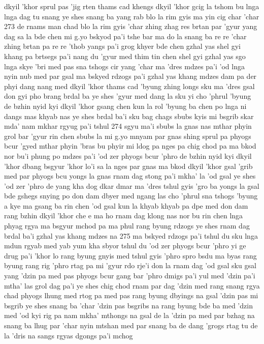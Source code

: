 dkyil 'khor sprul pas 'jig rten thams cad khengs
dkyil 'khor gcig la tshom bu lnga lnga dag tu snang
ye shes snang ba yang rab blo la rim gyis ma yin cig char 'char
273
de rnams man chad blo la rim gyis 'char zhing zhag res brtan par 'gyur
yang dag sa la bde chen mi g.yo bskyod pa'i tshe
bar ma do la snang ba re re 'char zhing brtan pa re re 'thob
yangs pa'i grog khyer bde chen gzhal yas shel gyi khang pa brtsegs pa'i nang du 'gyur med thim
tin chen shel gyi gzhal yas sgo lnga skye 'bri med pas sna tshogs cir yang 'char
ma 'dres mdzes pa'i 'od lnga nyin nub med par gsal
ma bskyed rdzogs pa'i gzhal yas khang mdzes dam pa der
phyi dang nang med dkyil 'khor thams cad 'byung zhing longs sku ma 'dres gsal
don gyi pho brang brdal ba ye shes 'gyur med dang la sku yi cho 'phrul 'byung
de bzhin nyid kyi dkyil 'khor gsang chen kun la rol
'byung ba chen po lnga ni dangs mas khyab nas ye shes brdal ba'i sku
bag chags sbubs kyis mi bsgrib skar mda' nam mkhar rgyug pa'i tshul
274
sgyu ma'i sbubs la gnas nas mthar phyin grol bar 'gyur
rin chen sbubs la mi g.yo mnyam par gnas shing sprul pa phyogs bcur 'gyed
mthar phyin 'bras bu phyir mi ldog pa nges pa chig chod pa
ma bkod nor bu'i phung po mdzes pa'i 'od zer phyogs bcur 'phro
de bzhin nyid kyi dkyil 'khor dbang bsgyur 'khor lo'i sa la nges par gnas
ma bkod dkyil 'khor gsal 'grib med par phyogs bcu yongs la gnas
rnam dag stong pa'i mkha' la 'od gsal ye shes 'od zer 'phro
de yang kha dog dkar dmar ma 'dres tshul gyis 'gro ba yongs la gsal
bde gshegs snying po don dam dbyer med ngang las cho 'phrul sna tshogs 'byung
a
kye ma gsang ba rin chen 'od gsal kun la khyab
khyab pa dpe med don dam rang bzhin dkyil 'khor che
e ma ho
rnam dag klong nas nor bu rin chen lnga
phyag rgya ma bsgyur mchod pa ma phul rang byung rdzogs
ye shes rnam dag brdal ba'i gzhal yas khang mdzes na
275
ma bskyed rdzogs pa'i tshul du sku lnga mdun rgyab med
yab yum kha sbyor tshul du 'od zer phyogs bcur 'phro
yi ge drug pa'i 'khor lo rang byung gnyis med tshul gyis 'phro
spro bsdu ma byas rang byung rang rig 'phro
rtag pa mi 'gyur rdo rje'i don la rnam dag 'od gsal sku
gsal yang 'dzin pa med pas phyogs bcur gang bar 'phro
dmigs pa'i yul med 'dzin pa'i mtha' las grol
dag pa'i ye shes chig chod rnam par dag
'dzin med rang snang rgya chad phyogs lhung med
rtog pa med pas rang byung dbyings na gsal
'dzin pas mi bsgrib ye shes snang ba 'char
'dzin pas bsgribs na rang byung bde ba med
'dzin med 'od kyi rig pa nam mkha' mthongs na gsal
de la 'dzin pa med par bzhag na snang ba lhug par 'char
nyin mtshan med par snang ba de dang 'grogs
rtag tu de la 'dris na sangs rgyas dgongs pa'i mchog
